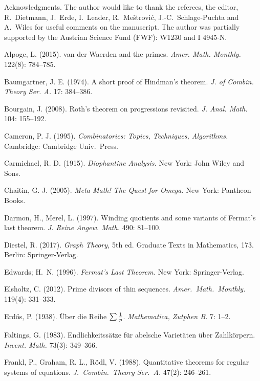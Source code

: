 \documentclass{article}
\theoremstyle{theorem}
\theoremstyle{definition}
\begin{document}
\begin{acknowledgment}{Acknowledgments.}
The author would like to thank the referees, the editor,
R.~Dietmann, 
J.~Erde, I.~Leader, R.~Me\v{s}trovi\'{c},
J.-C.~Schlage-Puchta and A.~Wiles
for useful comments on the manuscript.
The author was partially supported by the Austrian Science Fund (FWF): W1230
and I 4945-N.
\end{acknowledgment}
\begin{thebibliography}{99}
Alpoge, L. (2015).
van der Waerden and the primes. \textit{Amer. Math. Monthly.} 122(8): 784--785.

Baumgartner, J. E. (1974).
A short proof of Hindman's theorem. 
\textit{J. of Combin. Theory Ser. A.} 17: 384--386.

Bourgain, J. (2008).
Roth's theorem on progressions revisited.
\textit{J. Anal. Math.} 104: 155--192. 


Cameron, P. J. (1995).
\textit{Combinatorics: Topics, Techniques, Algorithms.} 
Cambridge: Cambridge Univ.~Press.

Carmichael, R. D. (1915).
\textit{Diophantine Analysis.}
New York: John Wiley and Sons.

Chaitin, G. J. (2005).
\textit{Meta Math! The Quest for Omega.}
New York: Pantheon Books.

Darmon, H., Merel, L. (1997).
Winding quotients and some variants of Fermat's last theorem.
\textit{ J. Reine Angew. Math.} 490: 81--100. 

Diestel, R. (2017). \textit{Graph Theory,}
5th ed. Graduate Texts in Mathematics, 173. Berlin: Springer-Verlag.



Edwards; H.~N. (1996).
\textit{Fermat's Last Theorem.}
New York: Springer-Verlag.

Elsholtz, C. (2012).
Prime divisors of thin sequences. \textit{Amer.~Math.~Monthly.} 119(4): 331--333.

Erd\H{o}s, P. (1938).
\"Uber die Reihe $\sum {1 \over p}$. 
\textit{Mathematica, Zutphen B.} 7: 1--2.

Faltings, G. (1983).
Endlichkeitss\"{a}tze f\"ur abelsche Variet\"aten \"uber Zahlk\"orpern.
\textit{Invent. Math.} 73(3): 349--366. 

Frankl, P., Graham, R. L., R\"odl, V. (1988). 
Quantitative theorems for regular systems of equations. 
\textit{J.~Combin.~Theory Ser.~A.} 47(2): 246--261. 


\end{thebibliography}
\end{document}
